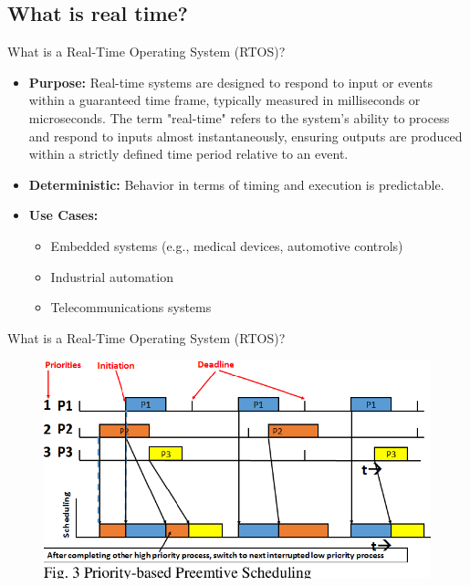 \documentclass[10pt]{beamer}
\begin{document}
\subsection{What is real time?}
\begin{frame}{What is a Real-Time Operating System (RTOS)?}
  \begin{itemize}
      \item \textbf{Purpose:} Real-time systems are designed to respond to input or events within a guaranteed time frame, typically measured in milliseconds or microseconds. The term "real-time" refers to the system’s ability to process and respond to inputs almost instantaneously, ensuring outputs are produced within a strictly defined time period relative to an event.
      \item \textbf{Deterministic:} Behavior in terms of timing and execution is predictable.
      \item \textbf{Use Cases:}
          \begin{itemize}
              \item Embedded systems (e.g., medical devices, automotive controls)
              \item Industrial automation
              \item Telecommunications systems
          \end{itemize}
  \end{itemize}
\end{frame}

\begin{frame}{What is a Real-Time Operating System (RTOS)?}
  \begin{figure}[h]
    \centering
    \includegraphics[width=1.0\textwidth]{figures/real_time_tasks.png}
    \label{fig:my_label}
    \end{figure}
\end{frame}
\end{document}
